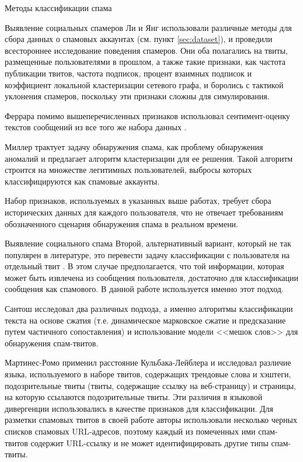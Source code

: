 \begin{section}{Методы классификации спама}
\begin{subsection}{Выявление социальных спамеров}
  Ли \cite{Lee} и Янг \cite{Yang} использовали различные методы для сбора данных о  спамовых аккаунтах (см. пункт \ref{sec:dataset}),
  и проведили всестороннее исследование поведения спамеров. Они оба полагались на твиты, размещенные пользователями в прошлом,
  а также такие признаки, как частота публикации твитов, частота подписок, процент взаимных подписок и коэффициент локальной кластеризации сетевого графа, и боролись с тактикой уклонения спамеров, поскольку эти признаки сложны для симулирования.

  Феррара \cite{Ferrara} помимо вышеперечисленных признаков использовал сентимент-оценку текстов сообщений из все того же набора данных \cite{Lee}.

  Миллер \cite{Miller} трактует задачу обнаружения спама, как проблему обнаружения аномалий и предлагает алгоритм кластеризации для ее решения.
  Такой алгоритм строится на множестве легитимных пользователей, выбросы которых классифицируются как спамовые аккаунты.

  Набор признаков, используемых в указанных выше работах, требует сбора исторических данных для каждого пользователя, что не отвечает требованиям обозначенного сценария обнаружения спама в реальном времени.
\end{subsection}

\begin{subsection}{Выявление социального спама}
Второй, альтернативный вариант, который не так популярен в литературе,
это перевести задачу классификации с пользователя на отдельный твит \cite{Benevenuto}.
В этом случае предполагается, что той информации, которая может быть извлечена из сообщения пользователя,
достаточно для классификации сообщения как спамового. В данной работе используется именно этот подход.

Сантош \cite{Santos} исследовал два различных подхода, а именно алгоритмы классификации текста на основе сжатия (т.е. динамическое марковское сжатие и предсказание путем частичного сопоставления) и использование модели <<мешок слов>> для обнаружения спам-твитов.

Мартинес-Ромо \cite{Martinez} применил расстояние Кульбака-Лейблера и исследовал различие языка, используемого в наборе твитов, содержащих трендовые слова и хэштеги, подозрительные твиты (твиты, содержащие ссылку на веб-страницу) и страницы, на которую ссылаются подозрительные твиты.
Эти различия в языковой дивергенции использовались в качестве признаков для классификации.
Для разметки спамовых твитов в своей работе авторы использовали несколько черных списков спамовых URL-адресов, поэтому каждый из помеченных ими спам-твитов содержит URL-ссылку и не может идентифицировать другие типы спам-твиты.


\end{subsection}
\end{section}
